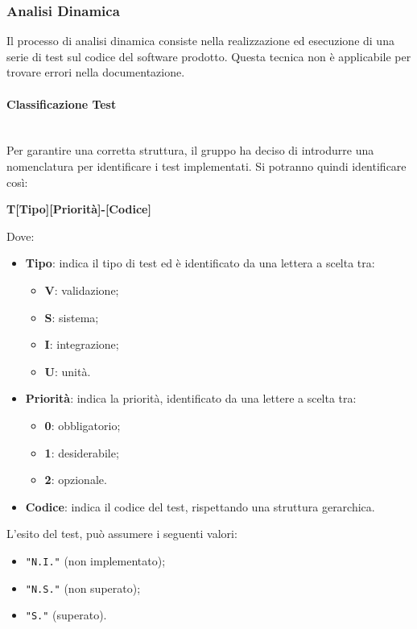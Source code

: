\subsubsection{Analisi Dinamica}
Il processo di analisi dinamica consiste nella realizzazione ed esecuzione di una serie di test sul codice del software prodotto. Questa tecnica non è applicabile per trovare errori nella documentazione.

\paragraph{Classificazione Test}\label{Class_test} \-\\
Per garantire una corretta struttura, il gruppo ha deciso di introdurre una nomenclatura per identificare i test implementati. Si potranno quindi identificare così:

\begin{center}
	\textbf{T[Tipo][Priorità]-[Codice]}
\end{center}
Dove:
\begin{itemize}
	\item \textbf{Tipo}: indica il tipo di test ed è identificato da una lettera a scelta tra:

	\begin{itemize}
		\item \textbf{V}: validazione;
		\item \textbf{S}: sistema;
		\item \textbf{I}: integrazione;
		\item \textbf{U}: unità.
	\end{itemize}

	\item \textbf{Priorità}: indica la priorità, identificato da una lettere a scelta tra:
	\begin{itemize}
		\item \textbf{0}: obbligatorio;
		\item \textbf{1}: desiderabile;
		\item \textbf{2}: opzionale.
	\end{itemize}
	\item \textbf{Codice}: indica il codice del test, rispettando una struttura gerarchica.
\end{itemize}

L'esito del test, può assumere i seguenti valori:
\begin{itemize}
	\item \texttt{"N.I."} (non implementato);
	\item \texttt{"N.S."} (non superato);
	\item \texttt{"S."} (superato).
\end{itemize}

